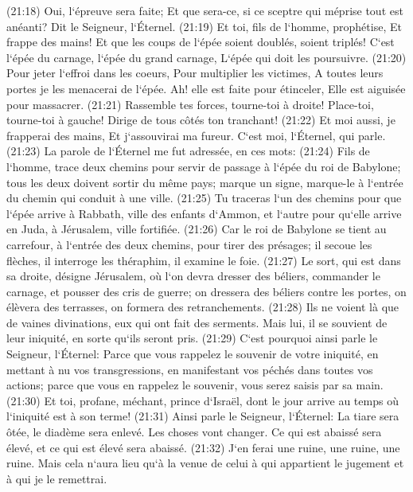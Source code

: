 \verse (21:18) Oui, l`épreuve sera faite; Et que sera-ce, si ce sceptre qui méprise tout est anéanti? Dit le Seigneur, l`Éternel. 
\verse (21:19) Et toi, fils de l`homme, prophétise, Et frappe des mains! Et que les coups de l`épée soient doublés, soient triplés! C`est l`épée du carnage, l`épée du grand carnage, L`épée qui doit les poursuivre. 
\verse (21:20) Pour jeter l`effroi dans les coeurs, Pour multiplier les victimes, A toutes leurs portes je les menacerai de l`épée. Ah! elle est faite pour étinceler, Elle est aiguisée pour massacrer. 
\verse (21:21) Rassemble tes forces, tourne-toi à droite! Place-toi, tourne-toi à gauche! Dirige de tous côtés ton tranchant! 
\verse (21:22) Et moi aussi, je frapperai des mains, Et j`assouvirai ma fureur. C`est moi, l`Éternel, qui parle. 
\verse (21:23) La parole de l`Éternel me fut adressée, en ces mots: 
\verse (21:24) Fils de l`homme, trace deux chemins pour servir de passage à l`épée du roi de Babylone; tous les deux doivent sortir du même pays; marque un signe, marque-le à l`entrée du chemin qui conduit à une ville. 
\verse (21:25) Tu traceras l`un des chemins pour que l`épée arrive à Rabbath, ville des enfants d`Ammon, et l`autre pour qu`elle arrive en Juda, à Jérusalem, ville fortifiée. 
\verse (21:26) Car le roi de Babylone se tient au carrefour, à l`entrée des deux chemins, pour tirer des présages; il secoue les flèches, il interroge les théraphim, il examine le foie. 
\verse (21:27) Le sort, qui est dans sa droite, désigne Jérusalem, où l`on devra dresser des béliers, commander le carnage, et pousser des cris de guerre; on dressera des béliers contre les portes, on élèvera des terrasses, on formera des retranchements. 
\verse (21:28) Ils ne voient là que de vaines divinations, eux qui ont fait des serments. Mais lui, il se souvient de leur iniquité, en sorte qu`ils seront pris. 
\verse (21:29) C`est pourquoi ainsi parle le Seigneur, l`Éternel: Parce que vous rappelez le souvenir de votre iniquité, en mettant à nu vos transgressions, en manifestant vos péchés dans toutes vos actions; parce que vous en rappelez le souvenir, vous serez saisis par sa main. 
\verse (21:30) Et toi, profane, méchant, prince d`Israël, dont le jour arrive au temps où l`iniquité est à son terme! 
\verse (21:31) Ainsi parle le Seigneur, l`Éternel: La tiare sera ôtée, le diadème sera enlevé. Les choses vont changer. Ce qui est abaissé sera élevé, et ce qui est élevé sera abaissé. 
\verse (21:32) J`en ferai une ruine, une ruine, une ruine. Mais cela n`aura lieu qu`à la venue de celui à qui appartient le jugement et à qui je le remettrai. 
